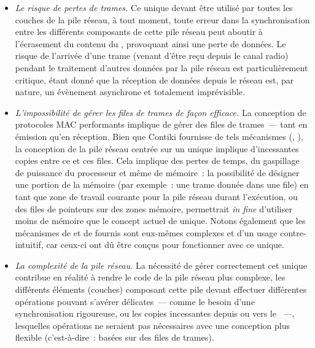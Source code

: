\begin{itemize}

\item \emph{Le risque de pertes de trames.} Ce  unique devant
être utilisé par toutes les couches de la pile réseau, à tout moment, toute
erreur dans la synchronisation entre les différents composants de cette
pile réseau peut aboutir à l'écrasement du contenu du ,
provoquant ainsi une perte de données. Le risque de l'arrivée d'une trame
(venant d'être reçu depuis le canal radio) pendant le traitement d'autres
données par la pile réseau est particulièrement critique, étant donné que
la réception de données depuis le réseau est, par nature, un évènement
asynchrone et totalement imprévisible.

\item \emph{L'impossibilité de gérer les files de trames de façon efficace.}
La conception de protocoles MAC performants implique de gérer des files
de trames~--- tant en émission qu'en réception. Bien que Contiki fournisse
de tels mécanismes (, ), la
conception de la pile réseau centrée sur un unique 
implique d'incessantes copies entre ce  et ces files.
Cela implique des pertes de temps, du gaspillage de puissance du processeur
et même de mémoire~: la possibilité de désigner une portion de la mémoire
(par exemple~: une trame donnée dans une file) en tant que zone de travail
courante pour la pile réseau durant l'exécution, ou des files de pointeurs
sur des zones mémoire, permettrait \textit{in fine} d'utiliser moins de
mémoire que le concept actuel de  unique. Notons également
que les mécanismes de  et de 
fournis sont eux-mêmes complexes et d'un usage contre-intuitif, car
ceux-ci ont dû être conçus pour fonctionner avec ce  unique.

\item \emph{La complexité de la pile réseau.} La nécessité de gérer
correctement cet unique  contribue en réalité à rendre
le code de la pile réseau plus complexe, les différents éléments (couches)
composant cette pile devant effectuer différentes opérations pouvant
s'avérer délicates~--- comme le besoin d'une synchronisation rigoureuse,
ou les copies incessantes depuis ou vers le ~---, lesquelles
opérations ne seraient pas nécessaires avec une conception plus flexible
(c'est-à-dire~: basées sur des files de trames).

\end{itemize}

